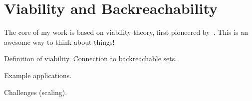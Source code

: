 
\section{Viability and Backreachability}

The core of my work is based on viability theory, first pioneered by~\citet{aubin2011viability}. This is an awesome way to think about things!

Definition of viability. Connection to backreachable sets. \par

Example applications. \par

Challenges (scaling). \par